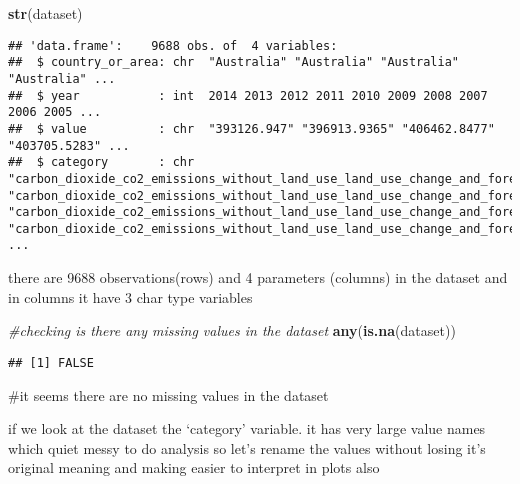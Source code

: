 \documentclass[
]{article}
\newenvironment{Shaded}{\begin{snugshade}}{\end{snugshade}}
\newcommand{\CommentTok}[1]{\textcolor[rgb]{0.56,0.35,0.01}{\textit{#1}}}
\newcommand{\KeywordTok}[1]{\textcolor[rgb]{0.13,0.29,0.53}{\textbf{#1}}}
\newcommand{\NormalTok}[1]{#1}
\begin{document}
\begin{Shaded}
\begin{Highlighting}[]
\KeywordTok{str}\NormalTok{(dataset)}
\end{Highlighting}
\end{Shaded}

\begin{verbatim}
## 'data.frame':    9688 obs. of  4 variables:
##  $ country_or_area: chr  "Australia" "Australia" "Australia" "Australia" ...
##  $ year           : int  2014 2013 2012 2011 2010 2009 2008 2007 2006 2005 ...
##  $ value          : chr  "393126.947" "396913.9365" "406462.8477" "403705.5283" ...
##  $ category       : chr  "carbon_dioxide_co2_emissions_without_land_use_land_use_change_and_forestry_lulucf_in_kilotonne_co2_equivalent" "carbon_dioxide_co2_emissions_without_land_use_land_use_change_and_forestry_lulucf_in_kilotonne_co2_equivalent" "carbon_dioxide_co2_emissions_without_land_use_land_use_change_and_forestry_lulucf_in_kilotonne_co2_equivalent" "carbon_dioxide_co2_emissions_without_land_use_land_use_change_and_forestry_lulucf_in_kilotonne_co2_equivalent" ...
\end{verbatim}

there are 9688 observations(rows) and 4 parameters (columns) in the
dataset and in columns it have 3 char type variables

\begin{Shaded}
\begin{Highlighting}[]
\CommentTok{#checking is there any missing values in the dataset}
\KeywordTok{any}\NormalTok{(}\KeywordTok{is.na}\NormalTok{(dataset))}
\end{Highlighting}
\end{Shaded}

\begin{verbatim}
## [1] FALSE
\end{verbatim}

\#it seems there are no missing values in the dataset

if we look at the dataset the `category' variable. it has very large
value names which quiet messy to do analysis so let's rename the values
without losing it's original meaning and making easier to interpret in
plots also
\end{document}
